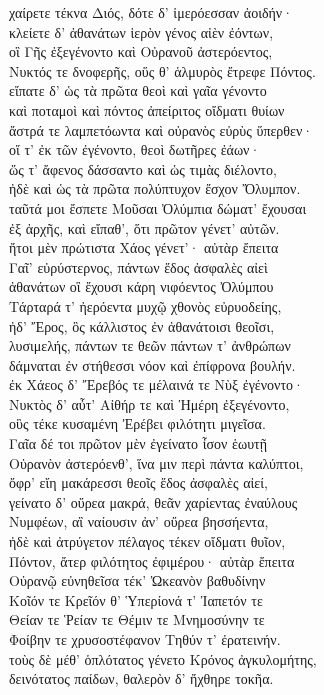 \begin{pages}
\begin{Leftside}
\quad{}χαίρετε τέκνα Διός, δότε δ' ἱμερόεσσαν ἀοιδήν· \\
κλείετε δ' ἀθανάτων ἱερὸν γένος αἰὲν ἐόντων, \\
οἳ Γῆς ἐξεγένοντο καὶ Οὐρανοῦ ἀστερόεντος,\\
Νυκτός τε δνοφερῆς, οὕς θ' ἁλμυρὸς ἔτρεφε Πόντος.\\
εἴπατε δ' ὡς τὰ πρῶτα θεοὶ καὶ γαῖα γένοντο \\
καὶ ποταμοὶ καὶ πόντος ἀπείριτος οἴδματι θυίων \\
ἄστρά τε λαμπετόωντα καὶ οὐρανὸς εὐρὺς ὕπερθεν·  \\
οἵ τ' ἐκ τῶν ἐγένοντο, θεοὶ δωτῆρες ἐάων· \\
ὥς τ' ἄφενος δάσσαντο καὶ ὡς τιμὰς διέλοντο, \\
ἠδὲ καὶ ὡς τὰ πρῶτα πολύπτυχον ἔσχον Ὄλυμπον.\\
ταῦτά μοι ἔσπετε Μοῦσαι Ὀλύμπια δώματ' ἔχουσαι \\
ἐξ ἀρχῆς, καὶ εἴπαθ', ὅτι πρῶτον γένετ' αὐτῶν. \\

\quad{}ἤτοι μὲν πρώτιστα Χάος γένετ'· αὐτὰρ ἔπειτα\\
Γαῖ' εὐρύστερνος, πάντων ἕδος ἀσφαλὲς αἰεὶ\\
ἀθανάτων οἳ ἔχουσι κάρη νιφόεντος Ὀλύμπου \\
Τάρταρά τ' ἠερόεντα μυχῷ χθονὸς εὐρυοδείης,\\
ἠδ' Ἔρος, ὃς κάλλιστος ἐν ἀθανάτοισι θεοῖσι, \\
λυσιμελής, πάντων τε θεῶν πάντων τ' ἀνθρώπων\\
δάμναται ἐν στήθεσσι νόον καὶ ἐπίφρονα βουλήν.\\

{\minion\Para}
ἐκ Χάεος δ' Ἔρεβός τε μέλαινά τε Νὺξ ἐγένοντο· \\
Νυκτὸς δ' αὖτ' Αἰθήρ τε καὶ Ἡμέρη ἐξεγένοντο,\\
οὓς τέκε κυσαμένη Ἐρέβει φιλότητι μιγεῖσα. \\

{\minion\Para}
Γαῖα δέ τοι πρῶτον μὲν ἐγείνατο ἶσον ἑωυτῇ\\
Οὐρανὸν ἀστερόενθ', ἵνα μιν περὶ πάντα καλύπτοι,\\
ὄφρ' εἴη μακάρεσσι θεοῖς ἕδος ἀσφαλὲς αἰεί,\\
γείνατο δ' οὔρεα μακρά, θεᾶν χαρίεντας ἐναύλους \\
Νυμφέων, αἳ ναίουσιν ἀν' οὔρεα βησσήεντα,  \\
ἠδὲ καὶ ἀτρύγετον πέλαγος τέκεν οἴδματι θυῖον,\\
Πόντον, ἄτερ φιλότητος ἐφιμέρου· αὐτὰρ ἔπειτα\\
Οὐρανῷ εὐνηθεῖσα τέκ' Ὠκεανὸν βαθυδίνην \\
Κοῖόν τε Κρεῖόν θ' Ὑπερίονά τ' Ἰαπετόν τε\\
Θείαν τε Ῥείαν τε Θέμιν τε Μνημοσύνην τε \\
Φοίβην τε χρυσοστέφανον Τηθύν τ' ἐρατεινήν.\\
τοὺς δὲ μέθ' ὁπλότατος γένετο Κρόνος ἀγκυλομήτης,\\
δεινότατος παίδων, θαλερὸν δ' ἤχθηρε τοκῆα. \\


\end{Leftside}
\end{pages}
